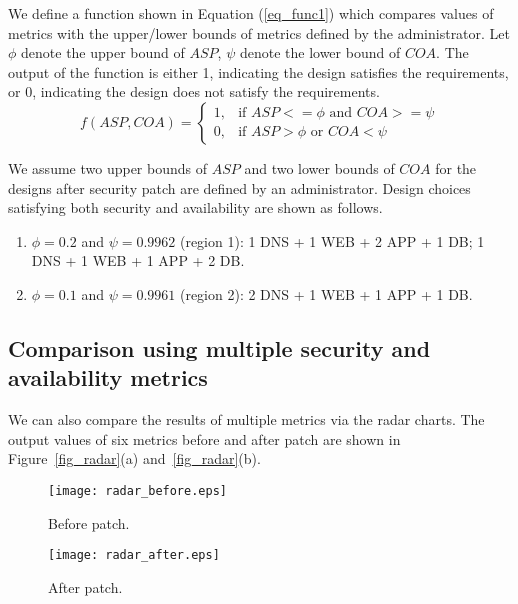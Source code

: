 \documentclass[conference]{IEEEtran}
\begin{document}
We define a function shown in Equation (\ref{eq_func1}) which compares values of metrics with the upper/lower bounds of metrics defined by the administrator. Let $\phi$ denote the upper bound of $\mathit{ASP}$, $\psi$ denote the lower bound of $\mathit{COA}$. The output of the function is either 1, indicating the design satisfies the requirements, or 0, indicating the design does not satisfy the requirements.
\begin{equation} \label{eq_func1}
f(\mathit{ASP}, \mathit{COA})=
\left\{
\begin{array}{ll}
1,& \text{if } \mathit{ASP} <= \phi \text{ and } \mathit{COA} >= \psi\\
0,& \text{if } \mathit{ASP} > \phi \text{ or } \mathit{COA} < \psi
\end{array}
\right.
\end{equation}

We assume two upper bounds of $\mathit{ASP}$ and two lower bounds of $\mathit{COA}$ for the designs after security patch are defined by an administrator. Design choices satisfying both security and availability are shown as follows.
\begin{enumerate}
\item $\phi = 0.2$ and $\psi = 0.9962$ (region 1): 1 DNS + 1 WEB + 2 APP + 1 DB; 1 DNS + 1 WEB + 1 APP + 2 DB.
\item $\phi = 0.1$ and $\psi = 0.9961$ (region 2): 2 DNS + 1 WEB + 1 APP + 1 DB.
\end{enumerate}

\subsection{Comparison using multiple security and availability metrics}

We can also compare the results of multiple metrics via the radar charts. The output values of six metrics before and after patch are shown in Figure~\ref{fig_radar}(a) and~\ref{fig_radar}(b). 
\begin{figure*}[hbt]
    \centering
    \begin{subfigure}{0.5\textwidth}
            \texttt{[image: radar\_before.eps]}
            \caption{Before patch.}
    \end{subfigure}
    \begin{subfigure}{0.47\textwidth}
            \texttt{[image: radar\_after.eps]}
            \caption{After patch.}
    \end{subfigure}
    \caption{Comparison of multiple redundancy designs using various metrics.}
    \label{fig_radar}
\end{figure*}
\end{document}
